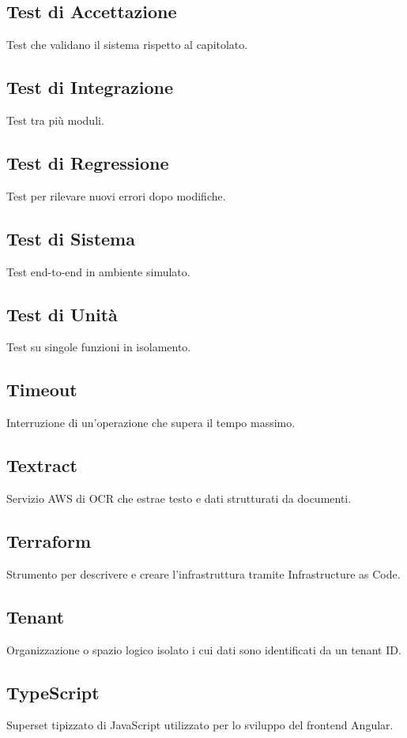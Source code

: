 \documentclass[a4paper,12pt]{article}
\begin{document}
\subsection{Test di Accettazione}
Test che validano il sistema rispetto al capitolato.

\subsection{Test di Integrazione}
Test tra più moduli.

\subsection{Test di Regressione}
Test per rilevare nuovi errori dopo modifiche.

\subsection{Test di Sistema}
Test end-to-end in ambiente simulato.

\subsection{Test di Unità}
Test su singole funzioni in isolamento.

\subsection{Timeout}
Interruzione di un'operazione che supera il tempo massimo.

\subsection{Textract}
Servizio AWS di OCR che estrae testo e dati strutturati da documenti.

\subsection{Terraform}
Strumento per descrivere e creare l'infrastruttura tramite Infrastructure as Code.

\subsection{Tenant}
Organizzazione o spazio logico isolato i cui dati sono identificati da un tenant ID.

\subsection{TypeScript}
Superset tipizzato di JavaScript utilizzato per lo sviluppo del frontend Angular.
\end{document}
